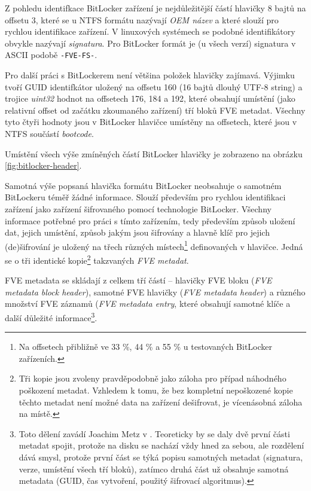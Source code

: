 Z pohledu identifkace BitLocker zařízení je nejdůležitější částí hlavičky 8 bajtů na offsetu 3, které se u NTFS formátu nazývají \emph{OEM název} a které slouží pro rychlou identifikace zařízení. V linuxových systémech se podobné identifikátory obvykle nazývají \emph{signatura}.  Pro BitLocker formát je (u všech verzí) signatura v ASCII podobě \texttt{-FVE-FS-}.

Pro další práci s BitLockerem není většina položek hlavičky zajímavá. Výjimku tvoří GUID identifkátor uložený na offsetu 160 (16 bajtů dlouhý UTF-8 string) a trojice \emph{uint32} hodnot na offsetech 176, 184 a 192, které obsahují umístění (jako relativní offset od začátku zkoumaného zařízení) tří bloků FVE metadat. Všechny tyto čtyři hodnoty jsou v BitLocker hlavičce umístěny na offsetech, které jsou v NTFS součástí \emph{bootcode}.

Umístění všech výše zmíněných  částí BitLocker hlavičky je zobrazeno na obrázku \ref{fig:bitlocker-header}.



Samotná výše popsaná hlavička formátu BitLocker neobsahuje o samotném BitLockeru téměř žádné informace. Slouží především pro rychlou identifikaci zařízení jako zařízení šifrovaného pomocí technologie BitLocker. Všechny informace potřebné pro práci s tímto zařízením, tedy především způsob uložení dat, jejich umístění, způsob jakým jsou šifrovány a hlavně klíč pro jejich (de)šifrování je uložený na třech různých místech\footnote{Na offsetech přibližně ve 33 \%, 44 \% a 55 \% u testovaných BitLocker zařízeních.} definovaných v hlavičce. Jedná se o tři identické kopie\footnote{Tři kopie jsou zvoleny pravděpodobně jako záloha pro případ náhodného poškození metadat. Vzhledem k tomu, že bez kompletní nepoškozené kopie těchto metadat není možné data na zařízení dešifrovat, je vícenásobná záloha na místě.} takzvaných \emph{FVE metadat}.

FVE metadata se skládají z celkem tří částí -- hlavičky FVE bloku (\emph{FVE metadata block header}), samotné FVE hlavičky (\emph{FVE metadata header}) a různého množství FVE záznamů (\emph{FVE metadata entry}, které obsahují samotné klíče a další důležité informace\cite{j2YgJeTq3IrWJRcd}\footnote{Toto dělení zavádí Joachim Metz v \cite{j2YgJeTq3IrWJRcd}. Teoreticky by se daly dvě první části metadat spojit, protože na disku se nachází vždy hned za sebou, ale rozdělení dává smysl, protože první část se týká popisu samotných metadat (signatura, verze, umístění všech tří bloků), zatímco druhá část už obsahuje samotná metadata (GUID, čas vytvoření, použitý šifrovací algoritmus).}.

